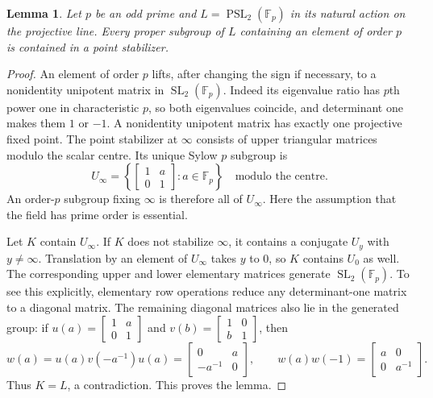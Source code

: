 \documentclass[11pt,a4paper]{article}
\newtheorem{lemma}[theorem]{Lemma}
\newcommand{\PSL}{\operatorname{PSL}}
\newcommand{\SL}{\operatorname{SL}}
\begin{document}
\begin{lemma}\label{prime}
Let $p$ be an odd prime and $L=\PSL_2(\mathbb F_p)$ in its natural
action on the projective line. Every proper subgroup of $L$ containing
an element of order $p$ is contained in a point stabilizer.
\end{lemma}
\begin{proof}
An element of order $p$ lifts, after changing the sign if necessary,
to a nonidentity unipotent matrix in $\SL_2(\mathbb F_p)$.
Indeed its eigenvalue ratio has $p$th power one in characteristic $p$,
so both eigenvalues coincide, and determinant one makes them $1$ or
$-1$. A nonidentity unipotent matrix has exactly one projective fixed
point. The point stabilizer at $\infty$ consists of upper triangular
matrices modulo the scalar centre. Its unique Sylow $p$ subgroup is
\[
 U_\infty=\left\{\begin{bmatrix}1&a\\0&1\end{bmatrix}:a\in\mathbb F_p\right\}
 \quad\text{modulo the centre}.
\]
An order-$p$ subgroup fixing $\infty$ is therefore all of $U_\infty$.
Here the assumption that the field has prime order is essential.

Let $K$ contain $U_\infty$. If $K$ does not stabilize $\infty$, it
contains a conjugate $U_y$ with $y\ne\infty$. Translation by an element
of $U_\infty$ takes $y$ to $0$, so $K$ contains $U_0$ as well.
The corresponding upper and lower elementary matrices generate
$\SL_2(\mathbb F_p)$. To see this explicitly, elementary row operations
reduce any determinant-one matrix to a diagonal matrix. The remaining
diagonal matrices also lie in the generated group: if
$u(a)=\left[\begin{smallmatrix}1&a\\0&1\end{smallmatrix}\right]$
and $v(b)=\left[\begin{smallmatrix}1&0\\b&1\end{smallmatrix}\right]$,
then
\[
 w(a)=u(a)v(-a^{-1})u(a)=\begin{bmatrix}0&a\\-a^{-1}&0\end{bmatrix},
 \qquad w(a)w(-1)=\begin{bmatrix}a&0\\0&a^{-1}\end{bmatrix}.
\]
Thus $K=L$, a contradiction. This proves the lemma.
\end{proof}
\end{document}

